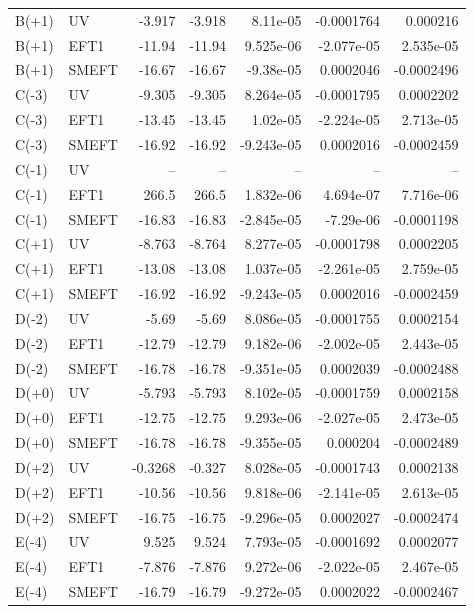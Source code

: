 \begin{table}[htbp]
\begin{tabular}{llrrrrr}
B(+1) & UV & -3.917 & -3.918 & 8.11e-05 & -0.0001764 & 0.000216 \\
B(+1) & EFT1 & -11.94 & -11.94 & 9.525e-06 & -2.077e-05 & 2.535e-05 \\
B(+1) & SMEFT & -16.67 & -16.67 & -9.38e-05 & 0.0002046 & -0.0002496 \\
C(-3) & UV & -9.305 & -9.305 & 8.264e-05 & -0.0001795 & 0.0002202 \\
C(-3) & EFT1 & -13.45 & -13.45 & 1.02e-05 & -2.224e-05 & 2.713e-05 \\
C(-3) & SMEFT & -16.92 & -16.92 & -9.243e-05 & 0.0002016 & -0.0002459 \\
C(-1) & UV & -- & -- & -- & -- & -- \\
C(-1) & EFT1 & 266.5 & 266.5 & 1.832e-06 & 4.694e-07 & 7.716e-06 \\
C(-1) & SMEFT & -16.83 & -16.83 & -2.845e-05 & -7.29e-06 & -0.0001198 \\
C(+1) & UV & -8.763 & -8.764 & 8.277e-05 & -0.0001798 & 0.0002205 \\
C(+1) & EFT1 & -13.08 & -13.08 & 1.037e-05 & -2.261e-05 & 2.759e-05 \\
C(+1) & SMEFT & -16.92 & -16.92 & -9.243e-05 & 0.0002016 & -0.0002459 \\
D(-2) & UV & -5.69 & -5.69 & 8.086e-05 & -0.0001755 & 0.0002154 \\
D(-2) & EFT1 & -12.79 & -12.79 & 9.182e-06 & -2.002e-05 & 2.443e-05 \\
D(-2) & SMEFT & -16.78 & -16.78 & -9.351e-05 & 0.0002039 & -0.0002488 \\
D(+0) & UV & -5.793 & -5.793 & 8.102e-05 & -0.0001759 & 0.0002158 \\
D(+0) & EFT1 & -12.75 & -12.75 & 9.293e-06 & -2.027e-05 & 2.473e-05 \\
D(+0) & SMEFT & -16.78 & -16.78 & -9.355e-05 & 0.000204 & -0.0002489 \\
D(+2) & UV & -0.3268 & -0.327 & 8.028e-05 & -0.0001743 & 0.0002138 \\
D(+2) & EFT1 & -10.56 & -10.56 & 9.818e-06 & -2.141e-05 & 2.613e-05 \\
D(+2) & SMEFT & -16.75 & -16.75 & -9.296e-05 & 0.0002027 & -0.0002474 \\
E(-4) & UV & 9.525 & 9.524 & 7.793e-05 & -0.0001692 & 0.0002077 \\
E(-4) & EFT1 & -7.876 & -7.876 & 9.272e-06 & -2.022e-05 & 2.467e-05 \\
E(-4) & SMEFT & -16.79 & -16.79 & -9.272e-05 & 0.0002022 & -0.0002467 \\

\end{tabular}
\end{table}
